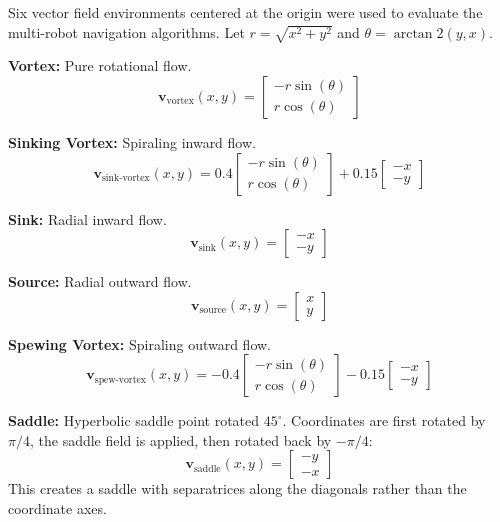 \documentclass[lettersize,journal]{IEEEtran}
\begin{document}
Six vector field environments centered at the origin were used to evaluate the multi-robot navigation algorithms. Let $r = \sqrt{x^2 + y^2}$ and $\theta = \arctan2(y, x)$.

\textbf{Vortex:} Pure rotational flow.
\begin{equation}
\mathbf{v}_{\text{vortex}}(x, y) = \begin{bmatrix} -r \sin(\theta) \\ r \cos(\theta) \end{bmatrix}
\end{equation}

\textbf{Sinking Vortex:} Spiraling inward flow.
\begin{equation}
\mathbf{v}_{\text{sink-vortex}}(x, y) = 0.4 \begin{bmatrix} -r \sin(\theta) \\ r \cos(\theta) \end{bmatrix} + 0.15 \begin{bmatrix} -x \\ -y \end{bmatrix}
\end{equation}

\textbf{Sink:} Radial inward flow.
\begin{equation}
\mathbf{v}_{\text{sink}}(x, y) = \begin{bmatrix} -x \\ -y \end{bmatrix}
\end{equation}

\textbf{Source:} Radial outward flow.
\begin{equation}
\mathbf{v}_{\text{source}}(x, y) = \begin{bmatrix} x \\ y \end{bmatrix}
\end{equation}

\textbf{Spewing Vortex:} Spiraling outward flow.
\begin{equation}
\mathbf{v}_{\text{spew-vortex}}(x, y) = -0.4 \begin{bmatrix} -r \sin(\theta) \\ r \cos(\theta) \end{bmatrix} - 0.15 \begin{bmatrix} -x \\ -y \end{bmatrix}
\end{equation}

\textbf{Saddle:} Hyperbolic saddle point rotated $45^\circ$. Coordinates are first rotated by $\pi/4$, the saddle field is applied, then rotated back by $-\pi/4$:
\begin{equation}
\mathbf{v}_{\text{saddle}}(x, y) = \begin{bmatrix} -y \\ -x \end{bmatrix}
\end{equation}
This creates a saddle with separatrices along the diagonals rather than the coordinate axes.
\end{document}
